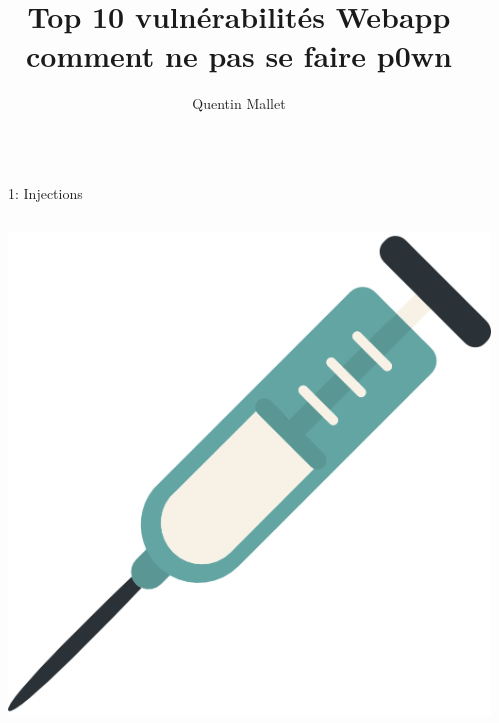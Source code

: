 \documentclass[final,hyperref={pdfpagelabels=false}]{beamer}
\title{\huge Top 10 vulnérabilités Webapp\\comment ne pas se faire p0wn} %
\author{Quentin Mallet} %
\institute{Serli} %
\begin{document}

\begin{frame}[t] %

\begin{columns}[t] %

\begin{column}{.02\textwidth}\end{column} %

\begin{column}{.465\textwidth} %


\begin{block}{1: Injections}

	\begin{columns}[T]

		\begin{column}{.125\textwidth} %
			\includegraphics[scale=0.33]{syringe.png}
		\end{column}


\end{columns}
\end{block}
\end{column}
\end{columns}
\end{frame}
\end{document}
